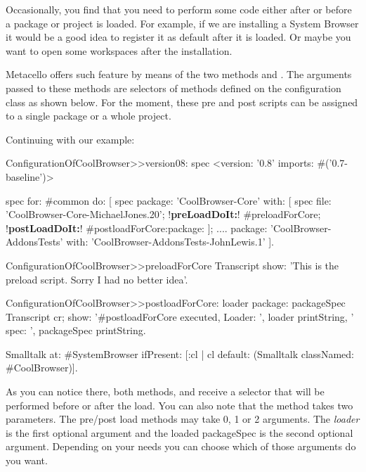 \documentclass[a4paper,10pt,twoside]{book}
\begin{document}
Occasionally, you find that you need to perform some code either after or before a package or project is loaded. For example, if we are installing a System Browser it would be a good idea to register it as default after it is loaded. Or maybe you want to open some workspaces after the installation. 

Metacello offers such feature by means of the two methods  and .  The arguments passed to these methods are selectors of methods defined on the configuration class as shown below. For the moment, these pre and post scripts can be assigned to a single package or a whole project. 

Continuing with our example:

\begin{code}{}
ConfigurationOfCoolBrowser>>version08: spec 
	<version: '0.8' imports: #('0.7-baseline')>
	
	spec for: #common do: [
		spec 
			package: 'CoolBrowser-Core' with: [
				spec 
					file: 'CoolBrowser-Core-MichaelJones.20';
					!\textbf{preLoadDoIt:}! #preloadForCore;
					!\textbf{postLoadDoIt:}! #postloadForCore:package: ];
			....
			package: 'CoolBrowser-AddonsTests' with: 'CoolBrowser-AddonsTests-JohnLewis.1' ].
\end{code}

\begin{code}{}
ConfigurationOfCoolBrowser>>preloadForCore
  	Transcript show: 'This is the preload script. Sorry I had no better idea'. 
\end{code}

\begin{code}{}
ConfigurationOfCoolBrowser>>postloadForCore: loader package: packageSpec
	Transcript cr; 
		show: '#postloadForCore executed, Loader: ', loader printString, 
			' spec: ', packageSpec printString.
	
	Smalltalk at: #SystemBrowser ifPresent: [:cl | cl default: (Smalltalk classNamed: #CoolBrowser)].
\end{code}

As you can notice there, both methods,  and  receive a selector that will be performed before or after the load. You can also note that the method   takes two parameters. The pre/post load methods may take 0, 1 or 2 arguments. The {\em loader}  is the first optional argument and the loaded packageSpec is the second optional argument. Depending on your needs you can choose which of those arguments do you want.
\end{document}
